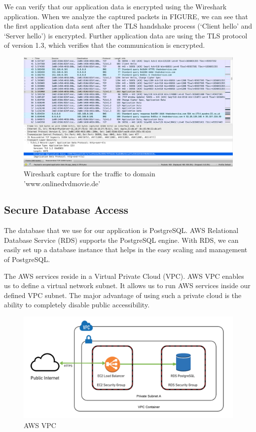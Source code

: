 We can verify that our application data is encrypted using the Wireshark application. When we analyze the captured packets in FIGURE, we can see that the first application data sent after the TLS handshake process (‘Client hello’ and ‘Server hello’) is encrypted. Further application data are using the TLS protocol of version 1.3, which verifies that the communication is encrypted.


\begin{figure}[h]
\centerline{\includegraphics[scale=.36]{images/Sinchan/2sinchan.png}}
\caption{Wireshark capture for the traffic to domain 'www.onlinedvdmovie.de'}
\label{fig2sinchan}
\end{figure}




\subsection{Secure Database Access}

The database that we use for our application is PostgreSQL. AWS Relational Database Service (RDS) supports the PostgreSQL engine. With RDS, we can easily set up a database instance that helps in the easy scaling and management of PostgreSQL.

The AWS services reside in a Virtual Private Cloud (VPC). AWS VPC enables us to define a virtual network subnet. It allows us to run AWS services inside our defined VPC subnet. The major advantage of using such a private cloud is the ability to completely disable public accessibility.

\begin{figure}[h]
\centerline{\includegraphics[scale=.36]{images/Sinchan/DB VPCsinchan.png}}
\caption{AWS VPC}
\label{DBVPC}
\end{figure}

